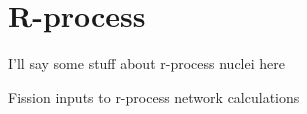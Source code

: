\chapter{R-process}\label{chap:rprocess}

\maketitle
I'll say some stuff about r-process nuclei here

Fission inputs to r-process network calculations